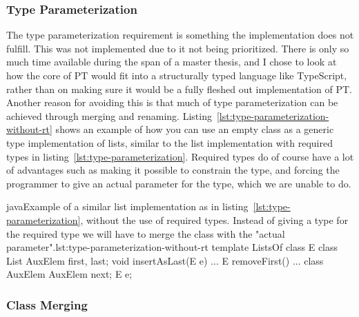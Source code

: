 \subsubsection{Type Parameterization}\label{subsubsec:pts-type-parameterization}

The type parameterization requirement is something the implementation does not fulfill.
This was not implemented due to it not being prioritized.
There is only so much time available during the span of a master thesis, and I chose to look at how the core of PT would fit into a structurally typed language like TypeScript, rather than on making sure it would be a fully fleshed out implementation of PT\@.
Another reason for avoiding this is that much of type parameterization can be achieved through merging and renaming.
Listing~\vref{lst:type-parameterization-without-rt} shows an example of how you can use an empty class as a generic type implementation of lists, similar to the list implementation with required types in listing~\vref{lst:type-parameterization}.
Required types do of course have a lot of advantages such as making it possible to constrain the type, and forcing the programmer to give an actual parameter for the type, which we are unable to do.

\begin{code}{java}{Example of a similar list implementation as in listing~\vref{lst:type-parameterization}, without the use of required types. Instead of giving a type for the required type we will have to merge the class  with the "actual parameter".}{lst:type-parameterization-without-rt}
    template ListsOf {
        class E { }
        class List {
            AuxElem first, last;
            void insertAsLast(E e) { ... }
            E removeFirst() { ... }
        }
        class AuxElem {
            AuxElem next;
            E e;
        }
    }
\end{code}

\subsubsection{Class Merging}\label{subsubsec:pts-class-merging}


